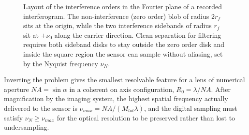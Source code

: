 \begin{figure}[h!]
    \centering
    \caption{Layout of the interference orders in the Fourier plane of a recorded interferogram. The non-interference (zero order) blob of radius $2r_f$ sits at the origin, while the two interference sidebands of radius $r_f$ sit at $\pm\nu_0$ along the carrier direction. Clean separation for filtering requires both sideband disks to stay outside the zero order disk and inside the square region the sensor can sample without aliasing, set by the Nyquist frequency $\nu_N$.}
    \label{fig:fourier_orders}
\end{figure}



Inverting the problem gives the smallest resolvable feature for a lens of numerical aperture $NA=\sin\alpha$ in a coherent on axis configuration, $R_0=\lambda/NA$. After magnification by the imaging system, the highest spatial frequency actually delivered to the sensor is $\nu_{max} = NA/(M_{tot}\lambda)$, and the digital sampling must satisfy $\nu_N \ge \nu_{max}$ for the optical resolution to be preserved rather than lost to undersampling.


